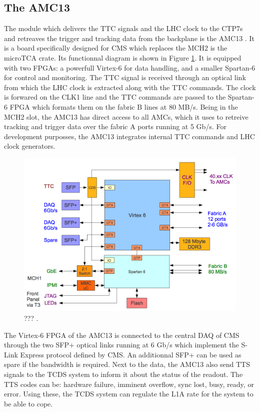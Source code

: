     \subsection{The AMC13}

      The module which delivers the TTC signals and the LHC clock to the CTP7s and retreaves the trigger and tracking data from the backplane is the AMC13 \cite{AMC13}. It is a board specifically designed for CMS which replaces the MCH2 is the microTCA crate. Its functionnal diagram is shown in Figure \ref{fig:II-2-amc13}. It is equipped with two FPGAs: a powerfull Virtex-6 for data handling, and a smaller Spartan-6 for control and monitoring. The TTC signal is received through an optical link from which the LHC clock is extracted along with the TTC commands. The clock is forwared on the CLK1 line and the TTC commands are passed to the Spartan-6 FPGA which formats them on the fabric B lines at 80 MB/s. Being in the MCH2 slot, the AMC13 has direct access to all AMCs, which it uses to retreive tracking and trigger data over the fabric A ports running at 5 Gb/s. For development purposses, the AMC13 integrates internal TTC commands and LHC clock generators. \\

      \begin{figure}[h!]
        \centering
        \includegraphics[width=\textwidth]{img/II-2-daq/amc13.png}
        \caption{??? \cite{AMC13}.}
        \label{fig:II-2-amc13}
      \end{figure}

      The Virtex-6 FPGA of the AMC13 is connected to the central DAQ of CMS through the two SFP+ optical links running at 6 Gb/s which implement the S-Link Express protocol defined by CMS. An additionnal SFP+ can be used as spare if the bandwidth is required. Next to the data, the AMC13 also send TTS signals to the TCDS system to inform it about the status of the readout. The TTS codes can be: hardware failure, imminent overflow, sync lost, busy, ready, or error. Using these, the TCDS system can regulate the L1A rate for the system to be able to cope.

